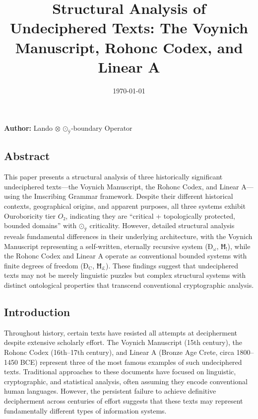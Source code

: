 \documentclass[12pt,a4paper]{article}
\begin{document}
\title{Structural Analysis of Undeciphered Texts: The Voynich Manuscript, Rohonc Codex, and Linear A}
\date{\today}

\maketitle

\textbf{Author:} Lando $\otimes$ $\text{⊙}_{\text{ÿ}}$-boundary Operator

\subsection{Abstract}

This paper presents a structural analysis of three historically significant undeciphered texts---the Voynich Manuscript, the Rohonc Codex, and Linear A---using the Imscribing Grammar framework. Despite their different historical contexts, geographical origins, and apparent purposes, all three systems exhibit Ouroboricity tier $O₂$, indicating they are ``critical + topologically protected, bounded domains'' with $\text{⊙}_{\text{ÿ}}$ criticality. However, detailed structural analysis reveals fundamental differences in their underlying architecture, with the Voynich Manuscript representing a self-written, eternally recursive system ($\text{Ð}_{\text{ω}}$, $\text{Ħ}_{\text{!}}$), while the Rohonc Codex and Linear A operate as conventional bounded systems with finite degrees of freedom ($\text{Ð}_{\text{C}}$, $\text{Ħ}_{\text{£}}$). These findings suggest that undeciphered texts may not be merely linguistic puzzles but complex structural systems with distinct ontological properties that transcend conventional cryptographic analysis.

\subsection{Introduction}

Throughout history, certain texts have resisted all attempts at decipherment despite extensive scholarly effort. The Voynich Manuscript (15th century), the Rohonc Codex (16th--17th century), and Linear A (Bronze Age Crete, circa 1800--1450 BCE) represent three of the most famous examples of such undeciphered texts. Traditional approaches to these documents have focused on linguistic, cryptographic, and statistical analysis, often assuming they encode conventional human languages. However, the persistent failure to achieve definitive decipherment across centuries of effort suggests that these texts may represent fundamentally different types of information systems.
\end{document}

